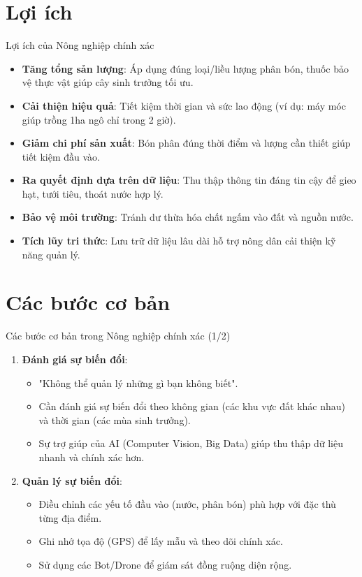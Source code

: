\documentclass[aspectratio=169]{beamer}
\begin{document}
\section{Lợi ích}
\begin{frame}{Lợi ích của Nông nghiệp chính xác}
    \begin{itemize}
        \item \textbf{Tăng tổng sản lượng}: Áp dụng đúng loại/liều lượng phân bón, thuốc bảo vệ thực vật giúp cây sinh trưởng tối ưu.
        \item \textbf{Cải thiện hiệu quả}: Tiết kiệm thời gian và sức lao động (ví dụ: máy móc giúp trồng 1ha ngô chỉ trong 2 giờ).
        \item \textbf{Giảm chi phí sản xuất}: Bón phân đúng thời điểm và lượng cần thiết giúp tiết kiệm đầu vào.
        \item \textbf{Ra quyết định dựa trên dữ liệu}: Thu thập thông tin đáng tin cậy để gieo hạt, tưới tiêu, thoát nước hợp lý.
        \item \textbf{Bảo vệ môi trường}: Tránh dư thừa hóa chất ngấm vào đất và nguồn nước.
        \item \textbf{Tích lũy tri thức}: Lưu trữ dữ liệu lâu dài hỗ trợ nông dân cải thiện kỹ năng quản lý.
    \end{itemize}
\end{frame}

\section{Các bước cơ bản}
\begin{frame}{Các bước cơ bản trong Nông nghiệp chính xác (1/2)}
    \begin{enumerate}
        \item \textbf{Đánh giá sự biến đổi}:
        \begin{itemize}
            \item "Không thể quản lý những gì bạn không biết".
            \item Cần đánh giá sự biến đổi theo không gian (các khu vực đất khác nhau) và thời gian (các mùa sinh trưởng).
            \item Sự trợ giúp của AI (Computer Vision, Big Data) giúp thu thập dữ liệu nhanh và chính xác hơn.
        \end{itemize}
        \vspace{0.3cm}
        \item \textbf{Quản lý sự biến đổi}:
        \begin{itemize}
            \item Điều chỉnh các yếu tố đầu vào (nước, phân bón) phù hợp với đặc thù từng địa điểm.
            \item Ghi nhớ tọa độ (GPS) để lấy mẫu và theo dõi chính xác.
            \item Sử dụng các Bot/Drone để giám sát đồng ruộng diện rộng.
        \end{itemize}
    \end{enumerate}
\end{frame}
\end{document}
